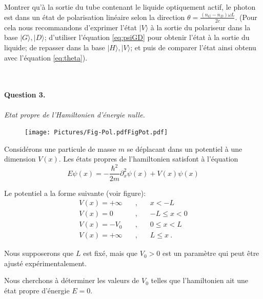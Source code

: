 Montrer qu'à la sortie du tube contenant le liquide optiquement actif, le photon est dans un état de polarisation linéaire selon la direction $\theta = \frac{(n_G - n_D) \omega L}{2 c}$.
(Pour cela nous recommandons d'exprimer l'état $\vert V \rangle$ à la sortie du polariseur dans la base $\vert G\rangle, \vert D \rangle$; d'utiliser l'équation \eqref{eq:psiGD} pour obtenir l'état à la sortie du liquide; de repasser dans la base $\vert H\rangle, \vert V \rangle$; et puis de comparer l'état ainsi obtenu avec l'équation \eqref{eq:theta}).


\newpage
\ 
\newpage
\ 
\newpage
\ 
\newpage
\ 


\paragraph{Question 3.} \textit{Etat propre de l'Hamiltonien d'énergie nulle.} \\

\begin{figure}
\centering
\texttt{[image: Pictures/Fig-Pol.pdfFigPot.pdf]}
\end{figure}


Considérons une particule de masse $m$ se déplacant dans un potentiel à une dimension $V(x)$. Les états propres de l'hamiltonien satisfont  à l'équation
\begin{equation}
E \psi(x) = - \frac{\hbar^2}{2 m} \partial_x^2 \psi(x) + V(x) \psi(x)
\end{equation}

Le potentiel a
la forme suivante (voir figure):
\begin{eqnarray}
V(x)=+\infty &\quad , \quad& x<-L\nonumber\\
V(x)=0 &\quad , \quad& -L\leq x < 0 \nonumber\\
V(x)=-V_0 &\quad , \quad& 0 \leq x < L \nonumber\\
V(x)=+\infty &\quad , \quad& L\leq x \ .
\end{eqnarray}

Nous supposerons que $L$ est fixé, mais que $V_0>0$ est un paramètre qui peut être ajusté expérimentalement.

Nous cherchons à déterminer les valeurs de $V_0$ telles que l'hamiltonien ait une état propre d'énergie $E=0$.

\newpage

